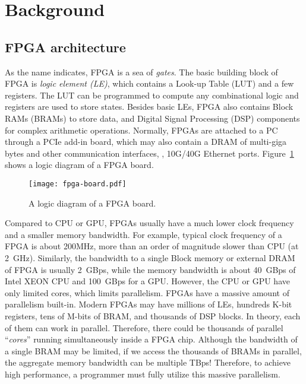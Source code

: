 \section{Background}
\label{sec:background}

\subsection{FPGA architecture}
\label{subsec:fpga}

As the name indicates, FPGA is a sea of \textit{gates}. 
The basic building block of FPGA is \textit{logic element (LE)},
which contains a Look-up Table (LUT) and a few registers. 
The LUT can be programmed to compute any combinational logic 
and registers are used to store states. 
%
Besides basic LEs, FPGA also contains Block RAMs (BRAMs) to store data, 
and Digital Signal Processing (DSP) components for complex arithmetic operations.
%
Normally, FPGAs are attached to a PC through a PCIe add-in board, which
may also contain a DRAM of multi-giga bytes and other communication
interfaces, \eg, 10G/40G Ethernet ports. 
Figure~\ref{fig:fpga} shows a logic diagram of a FPGA board.

\begin{figure}[t]
\centering
\texttt{[image: fpga-board.pdf]}
\vspace{-10pt}
\caption{A logic diagram of a FPGA board.}
\label{fig:fpga}
\vspace{-10pt}
\end{figure}

%
%

Compared to CPU or GPU, FPGAs usually have a much lower clock frequency
and a smaller memory bandwidth.
For example, typical clock frequency of a FPGA is about 200MHz, 
more than an order of magnitude slower than CPU (at 2~GHz). 
Similarly, the bandwidth to a single Block memory or external DRAM of FPGA 
is usually 2~GBps, while the memory bandwidth
is about 40~GBps of Intel XEON CPU and 100~GBps for a GPU. 
%
However, the CPU or GPU have only limited cores, which limits parallelism.
FPGAs have a massive amount of parallelism built-in. 
Modern FPGAs may have millions of LEs, hundreds K-bit registers, tens of M-bits of BRAM, 
and thousands 
of DSP blocks. In theory, each of them can work in parallel. 
Therefore, there could be thousands of parallel ``\textit{cores}'' 
running simultaneously inside a FPGA chip. 
Although the bandwidth of a single BRAM may be limited, if we access the  
thousands of BRAMs in parallel, the aggregate memory bandwidth can be multiple TBps! 
%
Therefore, to achieve high performance, a programmer
must fully utilize this massive parallelism.

